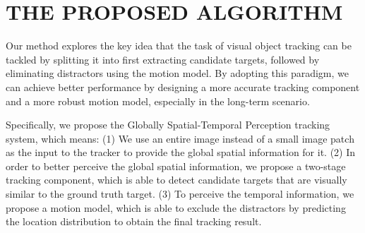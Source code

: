 \section{THE PROPOSED ALGORITHM}
\label{sec:method}

Our method explores the key idea that the task of visual object tracking can be tackled by splitting it into first extracting candidate targets, followed by eliminating distractors using the motion model.
By adopting this paradigm, we can achieve better performance by designing a more accurate tracking component and a more robust motion model, especially in the long-term scenario.

Specifically, we propose the Globally Spatial-Temporal Perception tracking system, which means: (1) We use an entire image instead of a small image patch as the input to the tracker to provide the global spatial information for it.  (2) In order to better perceive the global spatial information, we propose a two-stage tracking component, which is able to detect candidate targets that are visually similar to the ground truth target. (3) To perceive the temporal information, we propose a motion model, which is able to exclude the distractors by predicting the location distribution to obtain the final tracking result.

